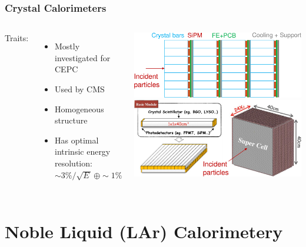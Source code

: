 \documentclass{beamer}
\newcommand{\bluetext}[1]{%
  \textcolor{myBlue}{#1}
}
\begin{document}
\begin{frame}
  \frametitle{Crystal Calorimeters}

  \begin{columns}[c]
    \bluetext{Traits:}
    \begin{itemize}
      \item Mostly investigated for CEPC
      \item Used by CMS
      \item Homogeneous structure
      \item Has optimal intrinsic energy resolution:
            $\sim 3\%/\sqrt{E\,} \, \oplus \sim 1\%$
    \end{itemize}

    \includegraphics[width=\linewidth]{figures/CEPC_crystal_calo_design1.png}%
    \vspace{6ex}
    \includegraphics[width=\linewidth]{figures/CEPC_crystal_calo_design2.png}
  \end{columns}
\end{frame}


\section{Noble Liquid (LAr) Calorimetery}
\end{document}
